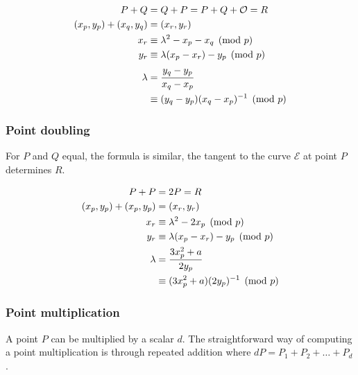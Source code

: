 \begin{equation}
\begin{split}
  P + Q &= Q + P = P + Q + \mathcal{O} = R \\
  (x_p, y_p) + (x_q, y_q) &= (x_r, y_r) \\
  x_r &\equiv \lambda^2 - x_p - x_q \pmod p \\
  y_r &\equiv \lambda(x_p - x_r) - y_p \pmod p  \\
  \lambda &= \cfrac{y_q - y_p}{x_q - x_p} \\
          &\equiv (y_q - y_p)(x_q - x_p)^{-1} \pmod p
\end{split}
\end{equation}

\subsubsection{Point doubling}

For $P$ and $Q$ equal, the formula is similar, the tangent to the curve
$\mathcal{E}$ at point $P$ determines $R$.

\begin{equation}
\begin{split}
  P + P &= 2P = R \\
  (x_p, y_p) + (x_p, y_p) &= (x_r, y_r) \\
  x_r &\equiv \lambda^2 - 2x_p \pmod p \\
  y_r &\equiv \lambda(x_p - x_r) - y_p \pmod p  \\
  \lambda &= \cfrac{3x_p^2 + a}{2y_p} \\
          &\equiv (3x_p^2 + a)(2y_p)^{-1} \pmod p
\end{split}
\end{equation}

\subsubsection{Point multiplication}

A point $P$ can be multiplied by a scalar $d$. The straightforward way of
computing a point multiplication is through repeated addition where $dP = P_1 +
P_2 + \dots + P_d$.



